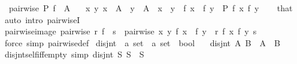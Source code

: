 \begin{isabellebody}
\ \ {\isachardoublequoteopen}pairwise\ P\ {\isacharparenleft}{\kern0pt}f\ {\isacharbackquote}{\kern0pt}\ A{\isacharparenright}{\kern0pt}{\isachardoublequoteclose}\isanewline
\ \ \ {\isachardoublequoteopen}{\isasymAnd}x\ y{\isachardot}{\kern0pt}\ x\ {\isasymin}\ A\ {\isasymLongrightarrow}\ y\ {\isasymin}\ A\ {\isasymLongrightarrow}\ x\ {\isasymnoteq}\ y\ {\isasymLongrightarrow}\ f\ x\ {\isasymnoteq}\ f\ y\ {\isasymLongrightarrow}\ P\ {\isacharparenleft}{\kern0pt}f\ x{\isacharparenright}{\kern0pt}\ {\isacharparenleft}{\kern0pt}f\ y{\isacharparenright}{\kern0pt}{\isachardoublequoteclose}\isanewline
%
\isadelimproof
\ \ %
\endisadelimproof
%
\isatagproof
{}\isamarkupfalse%
\ that\ \isamarkupfalse%
\ {\isacharparenleft}{\kern0pt}auto\ intro{\isacharcolon}{\kern0pt}\ pairwiseI{\isacharparenright}{\kern0pt}%
\endisatagproof
{\isafoldproof}%
%
\isadelimproof
\isanewline
%
\endisadelimproof
\isanewline
{}\isamarkupfalse%
\ pairwise{\isacharunderscore}{\kern0pt}image{\isacharcolon}{\kern0pt}\ {\isachardoublequoteopen}pairwise\ r\ {\isacharparenleft}{\kern0pt}f\ {\isacharbackquote}{\kern0pt}\ s{\isacharparenright}{\kern0pt}\ {\isasymlongleftrightarrow}\ pairwise\ {\isacharparenleft}{\kern0pt}{\isasymlambda}x\ y{\isachardot}{\kern0pt}\ {\isacharparenleft}{\kern0pt}f\ x\ {\isasymnoteq}\ f\ y{\isacharparenright}{\kern0pt}\ {\isasymlongrightarrow}\ r\ {\isacharparenleft}{\kern0pt}f\ x{\isacharparenright}{\kern0pt}\ {\isacharparenleft}{\kern0pt}f\ y{\isacharparenright}{\kern0pt}{\isacharparenright}{\kern0pt}\ s{\isachardoublequoteclose}\isanewline
%
\isadelimproof
\ \ %
\endisadelimproof
%
\isatagproof
{}\isamarkupfalse%
\ {\isacharparenleft}{\kern0pt}force\ simp{\isacharcolon}{\kern0pt}\ pairwise{\isacharunderscore}{\kern0pt}def{\isacharparenright}{\kern0pt}%
\endisatagproof
{\isafoldproof}%
%
\isadelimproof
\isanewline
%
\endisadelimproof
\isanewline
{}\isamarkupfalse%
\ disjnt\ {\isacharcolon}{\kern0pt}{\isacharcolon}{\kern0pt}\ {\isachardoublequoteopen}{\isacharprime}{\kern0pt}a\ set\ {\isasymRightarrow}\ {\isacharprime}{\kern0pt}a\ set\ {\isasymRightarrow}\ bool{\isachardoublequoteclose}\isanewline
\ \ \ {\isachardoublequoteopen}disjnt\ A\ B\ {\isasymlongleftrightarrow}\ A\ {\isasyminter}\ B\ {\isacharequal}{\kern0pt}\ {\isacharbraceleft}{\kern0pt}{\isacharbraceright}{\kern0pt}{\isachardoublequoteclose}\isanewline
\isanewline
{}\isamarkupfalse%
\ disjnt{\isacharunderscore}{\kern0pt}self{\isacharunderscore}{\kern0pt}iff{\isacharunderscore}{\kern0pt}empty\ {\isacharbrackleft}{\kern0pt}simp{\isacharbrackright}{\kern0pt}{\isacharcolon}{\kern0pt}\ {\isachardoublequoteopen}disjnt\ S\ S\ {\isasymlongleftrightarrow}\ S\ {\isacharequal}{\kern0pt}\ {\isacharbraceleft}{\kern0pt}{\isacharbraceright}{\kern0pt}{\isachardoublequoteclose}\isanewline

\end{isabellebody}

